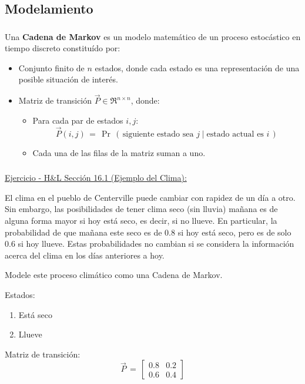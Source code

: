 \documentclass[ 10pt, xcolor = dvipsnames]{beamer}
\begin{document}
\subsection{Modelamiento}

\begin{frame}[allowframebreaks]
\frametitle{\insertsubsection}

Una \textbf{Cadena de Markov} es un modelo matem\'atico de un proceso estoc\'astico \linebreak en tiempo discreto constitu\'ido por: 
\begin{itemize}
\item Conjunto finito de $n$ estados, donde cada estado es una representaci\'on de una posible situaci\'on de inter\'es. 
\item Matriz de transici\'on $\vec{P} \in \Re^{n \times n}$, donde: 
\begin{itemize}
\item Para cada par de estados $i,j$: 
\[
\vec{P}(i,j) \, = \, 
\Pr \, ( \, 
\text{siguiente estado sea } j \mid
\text{estado actual es } i \, )
\]
\item Cada una de las filas de la matriz suman a uno. 
\end{itemize}
\end{itemize}

\end{frame}

\begin{frame}[allowframebreaks]
\frametitle{\insertsubsection}

\underline{Ejercicio - H\&L Secci\'on 16.1 (Ejemplo del Clima):}

El clima en el pueblo de Centerville puede cambiar con rapidez de un d\'ia a otro. Sin embargo, las posibilidades de tener clima seco (sin lluvia) ma\~nana es de alguna forma mayor si hoy est\'a seco, es decir, si no llueve. En particular, \linebreak la probabilidad de que ma\~nana este seco es de 0.8 si hoy est\'a seco, pero \linebreak es de solo 0.6 si hoy llueve. Estas probabilidades no cambian si se considera \linebreak la informaci\'on acerca del clima en los d\'ias anteriores a hoy. 

Modele este proceso clim\'atico como una Cadena de Markov. 
\framebreak

Estados: 
\begin{enumerate}
\item Est\'a seco
\item Llueve
\end{enumerate}

Matriz de transici\'on:
\[
\vec{P} \, = \, 
\left[
\begin{array}{cc}
0.8 & 0.2 \\ 0.6 & 0.4
\end{array}
\right]
\]

\end{frame}
\end{document}

